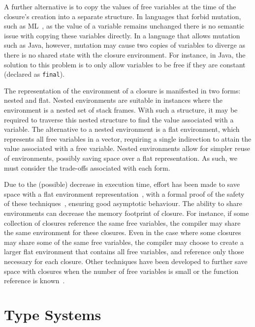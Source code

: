 A further alternative is to copy the values of free variables at the time of the closure's creation into a separate structure. In languages that forbid mutation, such as ML~\cite{milner1997definition}, as the value of a variable remains unchanged there is no semantic issue with copying these variables directly. In a language that allows mutation such as Java, however, mutation may cause two copies of variables to diverge as there is no shared state with the closure environment. For instance, in Java, the solution to this problem is to only allow variables to be free if they are constant (declared as \texttt{final}). 

The representation of the environment of a closure is manifested in two forms: nested and flat. Nested environments are suitable in instances where the environment is a nested set of stack frames. With such a structure, it may be required to traverse this nested structure to find the value associated with a variable. The alternative to a nested environment is a flat environment, which represents all free variables in a vector, requiring a single indirection to attain the value associated with a free variable. Nested environments allow for simpler reuse of environments, possibly saving space over a flat representation. As such, we must consider the trade-offs associated with each form.

Due to the (possible) decrease in execution time, effort has been made to save space with a flat environment representation~\cite{shao2000efficient}, with a formal proof of the safety of these techniques~\cite{paraskevopoulou2019closure}, ensuring good asymptotic behaviour. The ability to share environments can decrease the memory footprint of closure. For instance, if some collection of closures reference the same free variables, the compiler may share the same environment for these closures. Even in the case where some closures may share some of the same free variables, the compiler may choose to create a larger flat environment that contains all free variables, and reference only those necessary for each closure. Other techniques have been developed to further save space with closures when the number of free variables is small or the function reference is known~\cite{keep2012optimizing}.

\section{Type Systems}
\label{sec:lit-review--types}

